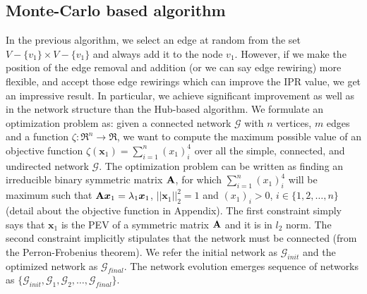 \documentclass[envcountreset,oribibl]{llncs}
\begin{document}
\subsection{Monte-Carlo based algorithm}
In the previous algorithm, we select an edge at random from the set $V-\{v_1\} \times V-\{v_1\}$ and always add it to the node $v_1$. However, if we make the position of the edge removal and addition (or we can say edge rewiring) more flexible, and accept those edge rewirings which can improve the IPR value, we get an impressive result. In particular, we achieve significant improvement as well as in the network structure than the Hub-based algorithm. We formulate an optimization problem as: given a connected network $\mathcal{G}$ with $n$ vertices, $m$ edges and a function $\zeta:\Re^{n} \rightarrow \Re$, we want to compute the maximum possible value of an objective function $\zeta(\bm{ x}_1)=\sum_{i=1}^n (x_1)_i^4$ over all the simple, connected, and undirected network $\mathcal{G}$. The optimization problem can be written as finding an irreducible binary symmetric matrix ${\bf A}$, for which $\sum_{i=1}^n (x_{1})_{i}^4$ will be maximum such that ${\bf A} \bm{x}_1=\lambda_1 \bm{x}_1$, $||\bm{ x}_1||^2_2=1$ and $(x_1)_i>0$, $i \in \{1,2,\ldots,n\}$ (detail about the objective function in Appendix). The first constraint simply says that $\bm{x}_1$ is the PEV of a symmetric matrix ${\bf A}$ and it is in $l_2$ norm. The second constraint implicitly stipulates that the network must be connected (from the Perron-Frobenius theorem). We refer the initial network as $\mathcal{G}_{init}$ and the optimized network as $\mathcal{G}_{final}$. The network evolution emerges sequence of networks as $\{\mathcal{G}_{init}, \mathcal{G}_1, \mathcal{G}_2, \ldots, \mathcal{G}_{final} \}$.
\end{document}
